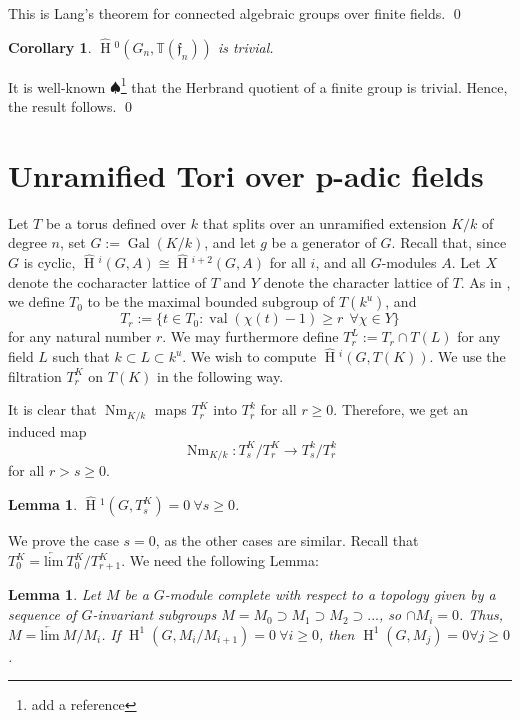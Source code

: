 \documentclass[11pt]{amsart}
\theoremstyle{plain}
\newtheorem{corollary}[theorem]{Corollary}
\newtheorem{lemma}[theorem]{Lemma}
\newcommand{\DRxxx}[1]{$\spadesuit$\footnote{#1}}
\newcommand{\HT}[1]{\hat{\HH}{}^{#1}}
\theoremstyle{definition}
\DeclareMathOperator{\Gal}{Gal}
\DeclareMathOperator{\val}{val}
\DeclareMathOperator{\HH}{H}
\DeclareMathOperator{\Nm}{Nm}
\begin{document}
\proof
This is Lang's theorem for connected algebraic groups over finite fields.
\qed

\begin{corollary}
$\HT{0}(G_n,\mathbb{T}(\mathfrak{f}_n))$ is trivial.
\end{corollary}

\proof
It is well-known
\DRxxx{add a reference}
that the Herbrand quotient of a finite group is trivial.  Hence, the result follows.
\qed

\section{Unramified Tori over p-adic fields}

Let $T$ be a torus defined over $k$ that splits over an unramified
extension $K/k$ of degree $n$, set $G := \Gal(K/k)$, and let $g$ be a
generator of $G$.  Recall that, since $G$ is cyclic,
$\HT{i}(G,A)\cong \HT{i+2}(G,A)$ for all $i$, and all
$G$-modules $A$.  Let $X$ denote the cocharacter lattice of $T$ and
$Y$ denote the character lattice of $T$.  As in \cite[Section 3]{moyprasad1},
we define $T_0$ to be the maximal bounded subgroup of
$T(k^u)$, and
$$T_r := \{t \in T_0 : \val(\chi(t) - 1) \geq r \ \ \forall \chi \in Y \}$$
for any natural number $r$.  We may
furthermore define $T_r^L := T_r \cap T(L)$ for any field $L$ such
that $k \subset L \subset k^u$.  We wish to compute $\HT{i}(G, T(K))$.
We use the filtration $T_r^K$ on $T(K)$ in the following way.

It is clear that $\Nm_{K/k}$ maps $T_r^K$ into $T_r^k$ for all $r \geq 0$.
Therefore, we get an induced map
$$\Nm_{K/k} : T_s^K / T_{r}^K \rightarrow T_s^k / T_{r}^k$$
for all $r > s \geq 0$.

\begin{lemma}\label{H1compactpart}
$\HT{1}(G, T_{s}^K) = 0 \ \forall s \geq 0$.
\end{lemma}

\proof
We prove the case $s = 0$, as the other cases are similar.  Recall
that $T_0^K = \underleftarrow{\mathrm{lim}} \ T_0^K / T_{r+1}^K$.  We
need the following Lemma:

\begin{lemma}\label{abstractcohomology}
  Let $M$ be a $G$-module complete with respect to a topology given by
  a sequence of $G$-invariant subgroups $M = M_0 \supset M_1 \supset
  M_2 \supset ...$, so $\cap M_i = 0$.  Thus,
  $M = \underleftarrow{\mathrm{lim}} \ M / M_i$.
  If $\HH^1(G, M_i / M_{i+1}) = 0 \ \forall i \geq 0$,
  then $\HH^1(G, M_j) = 0 \forall j \geq 0$.
\end{lemma}
\end{document}
